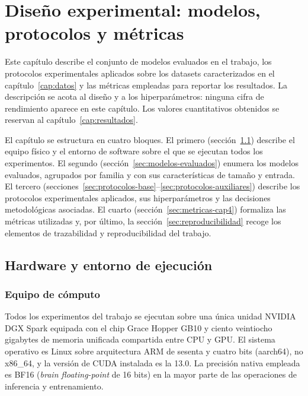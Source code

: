 
\chapter{Diseño experimental: modelos, protocolos y métricas}
\label{cap:experimental}

Este capítulo describe el conjunto de modelos evaluados en el
trabajo, los protocolos experimentales aplicados sobre los datasets
caracterizados en el capítulo~\ref{cap:datos} y las métricas
empleadas para reportar los resultados. La descripción se acota al
diseño y a los hiperparámetros: ninguna cifra de rendimiento aparece
en este capítulo. Los valores cuantitativos obtenidos se reservan al
capítulo~\ref{cap:resultados}.

El capítulo se estructura en cuatro bloques. El primero
(sección~\ref{sec:hardware-cap4}) describe el equipo físico y el
entorno de software sobre el que se ejecutan todos los
experimentos. El segundo (sección~\ref{sec:modelos-evaluados})
enumera los modelos evaluados, agrupados por familia y con sus
características de tamaño y entrada. El tercero
(secciones~\ref{sec:protocolos-base}--\ref{sec:protocolos-auxiliares})
describe los protocolos experimentales aplicados, sus
hiperparámetros y las decisiones metodológicas asociadas. El
cuarto (sección~\ref{sec:metricas-cap4}) formaliza las métricas
utilizadas y, por último, la sección~\ref{sec:reproducibilidad}
recoge los elementos de trazabilidad y reproducibilidad del
trabajo.

\section{Hardware y entorno de ejecución}
\label{sec:hardware-cap4}

\subsection{Equipo de cómputo}
\label{sec:hardware-equipo}

Todos los experimentos del trabajo se ejecutan sobre una única
unidad NVIDIA DGX Spark equipada con el chip Grace Hopper GB10 y
ciento veintiocho gigabytes de memoria unificada compartida entre
CPU y GPU. El sistema operativo es Linux sobre arquitectura ARM de
sesenta y cuatro bits (aarch64), no x86\_64, y la versión de CUDA
instalada es la 13.0. La precisión nativa empleada es BF16
(\emph{brain floating-point} de 16 bits) en la mayor parte de las
operaciones de inferencia y entrenamiento.

